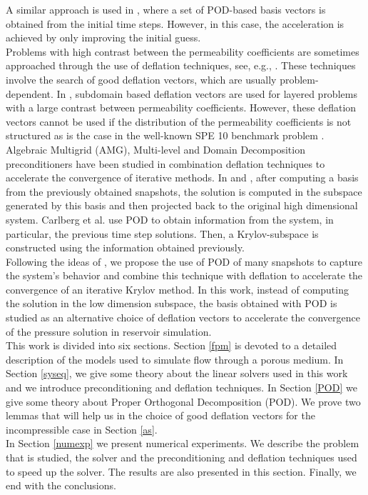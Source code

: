 \documentclass[12pt]{article}
\begin{document}
A similar approach is used in \cite{Mark06}, where a set of POD-based 
basis vectors is obtained from the initial time steps. However, in this case, the acceleration is 
achieved by only improving the initial guess.\\
Problems with high contrast between the permeability coefficients are sometimes approached through the 
use of deflation techniques, see, e.g., \cite{Vuik99}. These techniques involve the search 
of good deflation vectors, which are usually problem-dependent. In \cite{Vuik99}, subdomain based deflation 
vectors are used for layered problems with a large contrast between permeability coefficients. However, 
these deflation vectors cannot be used if the distribution of the permeability coefficients  is not 
structured as is the case in the well-known SPE 10 benchmark problem \cite{Christie01}.\\
Algebraic Multigrid (AMG)\cite{Klie07}, Multi-level and Domain Decomposition \cite{Tang09} preconditioners have been studied in combination deflation techniques to accelerate the convergence of iterative methods.
In \cite{Astrid11,Mark06} and \cite{Pasetto16}, after computing a basis from the 
previously obtained snapshots, the solution is computed in the subspace generated by this basis and then projected 
back to the original high dimensional system. Carlberg et al. \cite{Carlberg15} use POD to obtain information 
from the system, in particular, the previous time step solutions. Then, a Krylov-subspace is constructed using the 
information obtained previously.\\
Following the ideas of \cite{Astrid11,Mark06,Pasetto16,Carlberg15}, we propose the use of POD of many snapshots 
to capture the system's behavior and combine this technique with deflation to accelerate the convergence of 
an iterative Krylov method.
In this work, instead of computing the solution in the low dimension subspace, the basis obtained with POD is 
studied as an alternative choice of deflation vectors 
to accelerate the convergence of the pressure solution in reservoir simulation.  \\
This work is divided into six sections. 
  Section \ref{fpm} is devoted to a detailed description of the models used to simulate flow through a porous medium. In Section \ref{syseq}, we give some theory about the linear solvers used in this work and we introduce preconditioning 
  and deflation techniques. 
  In Section \ref{POD} we give some theory about Proper Orthogonal Decomposition (POD). We prove two lemmas that will help us in the choice of good deflation vectors for the 
  incompressible case in Section \ref{as}.\\
 In Section \ref{numexp} we present numerical experiments. We describe the problem that is studied, the solver and the preconditioning and deflation techniques used to speed up the solver. The results are also presented
 in this section.
 Finally, we end with the conclusions.
 
\end{document}
